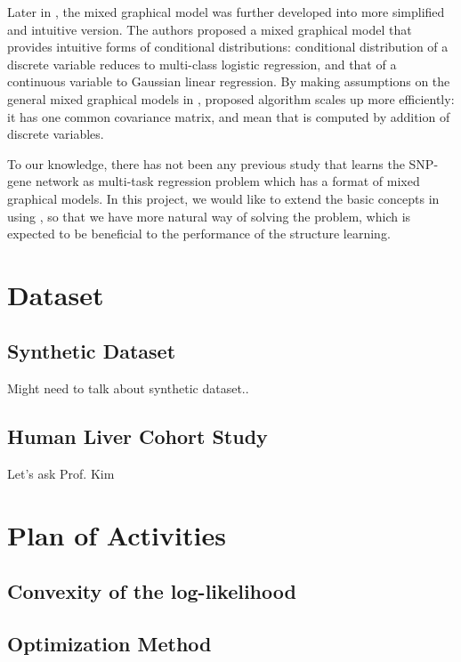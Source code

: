 \documentclass{article}
\begin{document}
Later in \cite{lee2013structure}, the mixed graphical model was further developed into more simplified and intuitive version. The authors proposed a mixed graphical model that provides intuitive forms of conditional distributions: conditional distribution of a discrete variable reduces to multi-class logistic regression, and that of a continuous variable to Gaussian linear regression. 
By making assumptions on the general mixed graphical models in \cite{lauritzen1989graphical}, proposed algorithm scales up more efficiently: it has one common covariance matrix, and mean that is computed by addition of discrete variables.


To our knowledge, there has not been any previous study that learns the SNP-gene network as multi-task regression problem which has a format of mixed graphical models. 
In this project, we would like to extend the basic concepts in \cite{sohn2012joint} using \cite{lee2013structure}, so that we have more natural way of solving the problem, which is expected to be beneficial to the performance of the structure learning.





\section{Dataset}

\subsection{Synthetic Dataset}
Might need to talk about synthetic dataset..

\subsection{Human Liver Cohort Study}
Let's ask Prof. Kim

\section{Plan of Activities}
\subsection{Convexity of the log-likelihood}

\subsection{Optimization Method}


\clearpage

\nocite{*}


\end{document}
